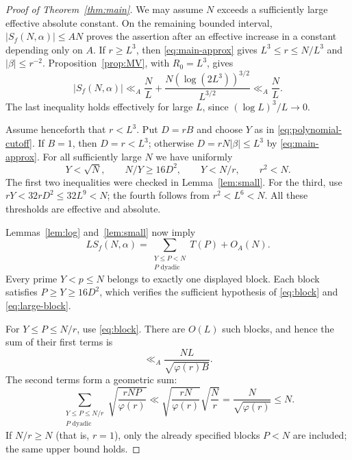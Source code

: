 \documentclass[11pt]{amsart}
\numberwithin{equation}{section}
\numberwithin{figure}{section}
\theoremstyle{definition}
\begin{document}
\begin{proof}[Proof of Theorem~\ref{thm:main}]
We may assume $N$ exceeds a sufficiently large effective absolute
constant. On the remaining bounded interval,
$|S_f(N,\alpha)|\le AN$ proves the assertion after an effective
increase in a constant depending only on $A$.
If $r\ge L^3$, then \eqref{eq:main-approx} gives
$L^3\le r\le N/L^3$ and $|\beta|\le r^{-2}$.
Proposition~\ref{prop:MV}, with $R_0=L^3$, gives
\[
 |S_f(N,\alpha)|\ll_A
 \frac NL+\frac{N(\log(2L^3))^{3/2}}{L^{3/2}}\ll_A\frac NL.
\]
The last inequality holds effectively for large $L$, since
$(\log L)^3/L\to0$.

Assume henceforth that $r<L^3$. Put $D=rB$ and choose $Y$ as in
\eqref{eq:polynomial-cutoff}. If $B=1$, then $D=r<L^3$; otherwise
$D=rN|\beta|\le L^3$ by \eqref{eq:main-approx}.
For all sufficiently large $N$ we have uniformly
\begin{equation}\label{eq:uniform-parameters}
 Y<\sqrt N,\qquad N/Y\ge16D^2,\qquad
 Y<N/r,\qquad r^2<N.
\end{equation}
The first two inequalities were checked in Lemma~\ref{lem:small}.
For the third, use $rY<32rD^2\le32L^9<N$; the fourth follows from
$r^2<L^6<N$. All these thresholds are effective and absolute.

Lemmas~\ref{lem:log} and~\ref{lem:small} now imply
\begin{equation}\label{eq:dyadic-reduction}
 L S_f(N,\alpha)=
 \sum_{\substack{Y\le P<N\\P\text{ dyadic}}}T(P)+O_A(N).
\end{equation}
Every prime $Y<p\le N$ belongs to exactly one displayed block.
Each block satisfies $P\ge Y\ge16D^2$, which verifies the sufficient
hypothesis of \eqref{eq:block} and \eqref{eq:large-block}.

For $Y\le P\le N/r$, use \eqref{eq:block}.
There are $O(L)$ such blocks, and hence the sum of their first terms is
\begin{equation}\label{eq:main-block-sum}
 \ll_A\frac{NL}{\sqrt{\varphi(r)B}}.
\end{equation}
The second terms form a geometric sum:
\begin{equation}\label{eq:geometric-sum}
 \sum_{\substack{Y\le P\le N/r\\P\text{ dyadic}}}
          \sqrt{\frac{rNP}{\varphi(r)}}
 \ll\sqrt{\frac{rN}{\varphi(r)}}\sqrt{\frac Nr}
 =\frac N{\sqrt{\varphi(r)}}\le N.
\end{equation}
If $N/r\ge N$ (that is, $r=1$), only the already specified blocks
$P<N$ are included; the same upper bound holds.


\end{proof}
\end{document}
